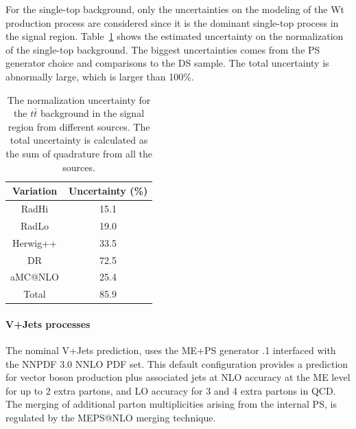 For the single-top background, only the uncertainties on the modeling of the Wt production process are considered since it is the dominant single-top process in the
signal region. Table~\ref{tab:boosted_unc_singletopwt} shows the estimated uncertainty on the normalization of the single-top background. The biggest uncertainties comes from
the PS generator choice and comparisons to the DS sample. The total uncertainty is abnormally large, which is larger than 100\%.
 
\begin{table}[htbp!]
\begin{center}
\begin{tabular}{c|c}
Variation   &  Uncertainty (\%) \\
\hline
RadHi       &               15.1 \\
RadLo       &               19.0 \\
Herwig++    &               33.5 \\
DR          &               72.5 \\
aMC@NLO     &               25.4 \\
\hline
Total      &                85.9 \\
\end{tabular}
\end{center}
\caption[The normalization uncertainty for the $t\bar{t}$ background in the SR
from different sources]{The normalization uncertainty for the $t\bar{t}$ background in the signal region
from different sources. The total uncertainty is calculated as the sum of quadrature from all
the sources.}
\label{tab:boosted_unc_singletopwt}
\end{table}
 
\FloatBarrier
 
 
\paragraph{V+Jets processes}
\label{sec:boosted_syst_modeling_vjets}
 
The nominal V+Jets prediction, uses the ME+PS generator .1 interfaced with the NNPDF 3.0 NNLO PDF set.
This default configuration provides a prediction for vector boson production plus associated jets at NLO accuracy
at the ME level for up to 2 extra partons, and LO accuracy for 3 and 4 extra partons in QCD.
The merging of additional parton multiplicities arising from the internal \SHERPA PS, is regulated by the
MEPS@NLO merging technique.
 
